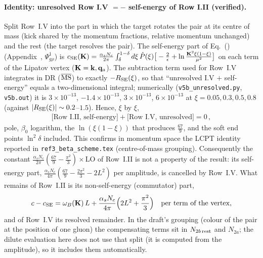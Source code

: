 \paragraph{Identity: unresolved Row I.V $=-$ self-energy of Row I.II (verified).} Split Row~I.V into the part in which the target rotates the pair at its centre of mass (kick shared by the momentum fractions, relative momentum unchanged) and the rest (the target resolves the pair). The self-energy part of Eq.~() (Appendix~, $\Psi^1_{g\rho}$) is $c_{\rm SE}(\mathbf{K})=\frac{\alpha_sN_c}{2\pi}\int_\delta^{1-\delta}d\xi\,\hat P(\xi)\big[-\frac2\epsilon+\ln\frac{\mathbf{K}^2\xi(1-\xi)}{\mu^2}\big]$ on each term of the Lipatov vertex ($\mathbf{K}=\mathbf{k},\mathbf{q}_a$). The subtraction term used for Row~I.V integrates in DR ($\overline{\rm MS}$) to exactly $-R_{\rm SE}(\xi)$, so that ``unresolved I.V $+$ self-energy'' equals a two-dimensional integral; numerically (\texttt{v5b\_unresolved.py}, \texttt{v5b.out}) it is $3\times10^{-13}$, $-1.4\times10^{-13}$, $3\times10^{-13}$, $6\times10^{-13}$ at $\xi=0.05,0.3,0.5,0.8$ (against $|R_{\rm SE}(\xi)|\sim0.2$--$1.5$). Hence, $\xi$ by $\xi$,
\begin{align}
\big[\text{Row I.II, self-energy}\big]+\big[\text{Row I.V, unresolved}\big]=0\,,\label{d:SEid}
\end{align}
pole, $\beta_0$ logarithm, the $\ln(\xi(1-\xi))$ that produces $\frac{67}{9}$, and the soft end points $\ln^2\delta$ included. This confirms in momentum space the LCPT identity reported in \texttt{ref3\_beta\_scheme.tex} (centre-of-mass grouping). Consequently the constant $\frac{\alpha_sN_c}{2\pi}(\frac{67}{9}-\frac{\pi^2}{3})\times$LO of Row~I.II is not a property of the result: its self-energy part, $\frac{\alpha_sN_c}{4\pi}(\frac{67}{9}-\frac{2\pi^2}{3}-2L^2)$ per amplitude, is cancelled by Row~I.V. What remains of Row~I.II is its non-self-energy (commutator) part,
\begin{align}
c-c_{\rm SE}=\omega_B(\mathbf{K})\,L+\frac{\alpha_sN_c}{4\pi}\Big(2L^2+\frac{\pi^2}{3}\Big)\quad\text{per term of the vertex},\label{d:ccomm}
\end{align}
and of Row~I.V its resolved remainder. In the draft's grouping (colour of the pair at the position of one gluon) the compensating terms sit in $N_{2b\,\rm rest}$ and $N_{2a}$; the dilute evaluation here does not use that split (it is computed from the amplitude), so it includes them automatically.

